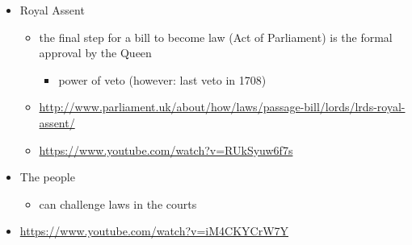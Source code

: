 \documentclass{article}
\begin{document}
\begin{itemize}
\item Royal Assent
\begin{itemize}
\item the final step for a bill to become law (Act of Parliament) is the formal approval by the Queen
\begin{itemize}
\item power of veto (however: last veto in 1708)
\end{itemize}
\item \url{http://www.parliament.uk/about/how/laws/passage-bill/lords/lrds-royal-assent/}
\item \url{https://www.youtube.com/watch?v=RUkSyuw6f7s}
\end{itemize}
\item The people
\begin{itemize}
\item can challenge laws in the courts
\end{itemize}

\item \url{https://www.youtube.com/watch?v=iM4CKYCrW7Y}
\end{itemize}




\end{document}
